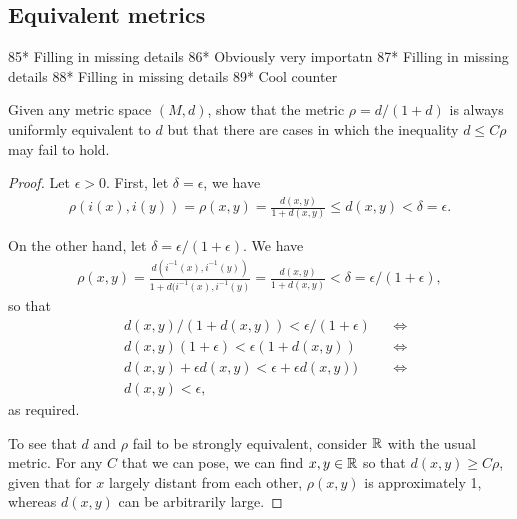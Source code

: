 \subsection{Equivalent metrics}

85* Filling in missing details 
86* Obviously very importatn
87* Filling in missing details
88* Filling in missing details 
89* Cool counter

\begin{exercise}{73}
Given any metric space $(M,d)$, show that the metric $\rho = d/(1+d)$ is always uniformly equivalent to $d$ but that there are cases in which the inequality $d\leq C\rho$ may fail to hold.
\end{exercise}
\begin{proof}
Let $\epsilon > 0$.
First, let $\delta=\epsilon$, we have 
\begin{align*}
    \rho(i(x),i(y)) 
    = \rho(x,y)
    = \frac{d(x,y)}{1+d(x,y)}
    \leq d(x,y) 
    < \delta
    = \epsilon.
\end{align*}

On the other hand, let $\delta = \epsilon/(1+\epsilon)$.
We have
\begin{align*}
    \rho(x,y)
    = \frac{d(i^{-1}(x),i^{-1}(y))}{1 + d(i^{-1}(x),i^{-1}(y)}
    = \frac{d(x,y)}{1 + d(x,y)}
    < \delta
    = \epsilon/(1+\epsilon),
\end{align*}
so that 
\begin{align*}
    &d(x,y)/(1+d(x,y)) < \epsilon/(1+\epsilon) &&\iff\\
    &d(x,y)(1+\epsilon) < \epsilon(1+d(x,y))  &&\iff\\
    &d(x,y) + \epsilon d(x,y) < \epsilon + \epsilon d(x,y))  &&\iff\\
    & d(x,y) < \epsilon,
\end{align*}
as required.

To see that $d$ and $\rho$ fail to be strongly equivalent, consider $\mathbb{R}$ with the usual metric.
For any $C$ that we can pose, we can find $x,y\in\mathbb{R}$ so that $d(x,y)\geq C\rho$, given that for $x$ largely distant from each other, $\rho(x,y)$ is approximately 1, whereas $d(x,y)$ can be arbitrarily large.
\end{proof} 

